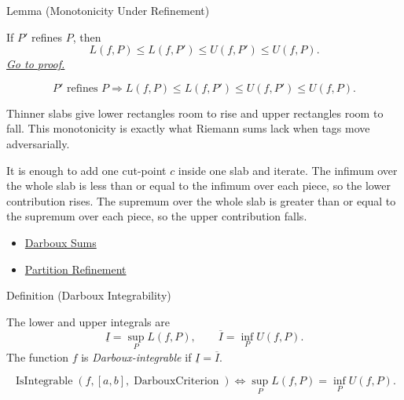 \begin{lemmabox}{Lemma (Monotonicity Under Refinement)}
\begin{lemma}
\label{lem:darboux-refinement-squeeze}
If \(P'\) refines \(P\), then
\[
  L(f,P)\le L(f,P')\le U(f,P')\le U(f,P).
\]
\hyperref[prf:darboux-refinement-squeeze]{\textit{Go to proof.}}
\end{lemma}
\end{lemmabox}

\begin{remark*}
\[
P'\text{ refines }P
\Longrightarrow
L(f,P)\le L(f,P')\le U(f,P')\le U(f,P).
\]
\end{remark*}

\begin{remark*}[Interpretation]
Thinner slabs give lower rectangles room to rise and upper rectangles room to
fall. This monotonicity is exactly what Riemann sums lack when tags move
adversarially.


It is enough to add one cut-point \(c\) inside one slab and iterate. The
infimum over the whole slab is less than or equal to the infimum over each
piece, so the lower contribution rises. The supremum over the whole slab is
greater than or equal to the supremum over each piece, so the upper
contribution falls.
\end{remark*}

\begin{dependencies}
\begin{itemize}
  \item \hyperref[def:darboux-sums]{Darboux Sums}
  \item \hyperref[def:partition-refinement]{Partition Refinement}
\end{itemize}
\end{dependencies}

\begin{definitionbox}{Definition (Darboux Integrability)}
\begin{definition}
\label{def:darboux-integrability}
The lower and upper integrals are
\[
  \underline I=\sup_P L(f,P),\qquad
  \overline I=\inf_P U(f,P).
\]
The function \(f\) is \emph{Darboux-integrable} if \(\underline I=\overline I\).
\end{definition}
\end{definitionbox}

\begin{remark*}
\[
\operatorname{IsIntegrable}(f,[a,b],\operatorname{DarbouxCriterion})
\Longleftrightarrow
\sup_P L(f,P)=\inf_P U(f,P).
\]
\end{remark*}

